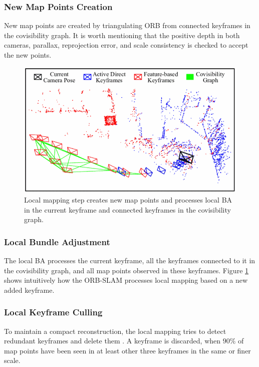 \documentclass[letterpaper, 10 pt, conference]{ieeeconf}  %
\begin{document}
\subsubsection{New Map Points Creation}
New map points are created by triangulating ORB from connected keyframes in the covisibility graph. It is worth mentioning that the positive depth in both cameras, parallax, reprojection error, and scale consistency is checked to accept the new points.

%
\begin{figure}[!htbp]%
\centering
\includegraphics[scale=0.3]{./images/local_mapping}
\caption{Local mapping step creates new map points and processes local BA in the current keyframe and connected keyframes in the covisibility graph. \cite{ORBSLAM}}
\label{Local mapping}
\end{figure}
%

\subsubsection{Local Bundle Adjustment}
The local BA processes the current keyframe, all the keyframes connected to it in the covisibility graph, and all map points observed in these keyframes. Figure \ref{Local mapping} shows intuitively how the ORB-SLAM processes local mapping based on a new added keyframe.

\subsubsection{Local Keyframe Culling}
To maintain a compact reconstruction, the local mapping tries to detect redundant keyframes and delete them \cite{24}. A keyframe is discarded, when $90\%$ of map points have been seen in at least other three keyframes in the same or
finer scale.
\end{document}

